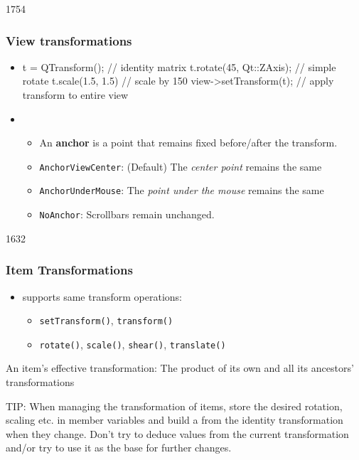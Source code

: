 \begin{slide}[fragile]{1754}\frametitle{View transformations}


\begin{itemize}
\item[] \begin{cpp}

    t = QTransform();        // identity matrix
    t.rotate(45, Qt::ZAxis); // simple rotate
    t.scale(1.5, 1.5)        // scale by 150%
    view->setTransform(t);   // apply transform to entire view
\end{cpp}

\item {}
    \begin{itemize}
    \item An \textbf{anchor} is a point that remains fixed before/after the transform.
    \item \texttt{AnchorViewCenter}: (Default) The \textit{center point} remains the same 
    \item \texttt{AnchorUnderMouse}: The \textit{point under the mouse} remains the same
    \item \texttt{NoAnchor}: Scrollbars remain unchanged.
    \end{itemize}
\end{itemize}
\end{slide}


\begin{slide}{1632}\frametitle{Item Transformations}
\begin{itemize}
\item {} supports same transform operations:

    \begin{itemize}
    \item \texttt{setTransform()}, \texttt{transform()}
    \item \texttt{rotate()}, \texttt{scale()}, \texttt{shear()}, \texttt{translate()} 
    \end{itemize}
\end{itemize}    

\begin{block}{An item's effective transformation:}
The product of its own and all its ancestors' transformations
\end{block}

{\small TIP: When managing the transformation of items, store the desired rotation, scaling etc. in member variables and build a  from the identity transformation when they change. Don't try to deduce values from the current transformation and/or try to use it as the base for further changes.}


\end{slide}


